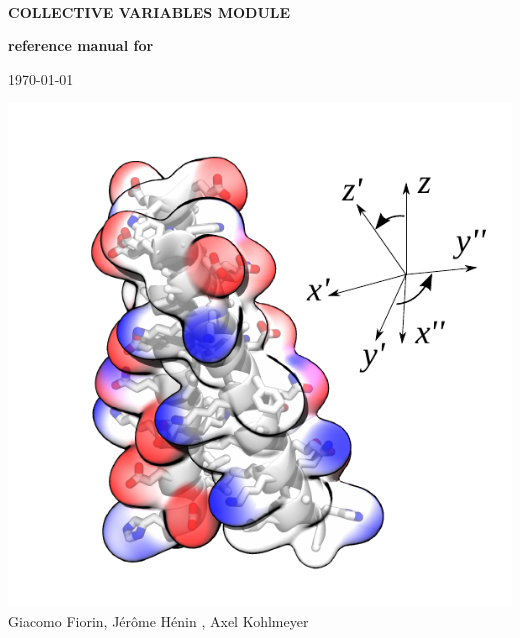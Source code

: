 \documentclass[11pt]{article}
\begin{document}
\begin{titlepage}

  \noindent\colorbox{background-color}{
    \begin{minipage}{1.0\textwidth}

        $\,$\\
        
        \noindent\textsf{\bfseries\Huge COLLECTIVE VARIABLES MODULE\\}
        
        \noindent\textsf{\bfseries\Huge reference manual
        \ifdefined\MDENGINE
        for \MDENGINE{}
        \fi
        \\}
        
        \noindent\textsf{\Large \today}

      \end{minipage}}

  \includegraphics[width=\textwidth]{figures/toc}
  \textsf{\large Giacomo Fiorin, J\'er\^ome H\'enin%
\ifdefined\LAMMPS%
, Axel Kohlmeyer
\fi
  }
\end{titlepage}

\newpage
\tableofcontents
\newpage




\newpage
\printindex

\newpage

%

\end{document}
